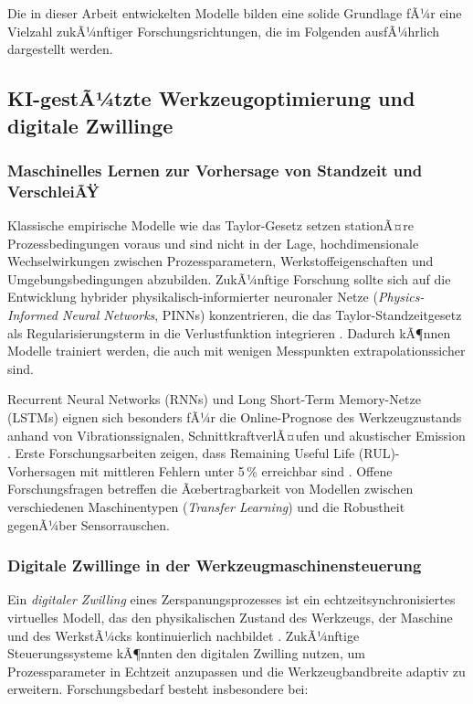 ﻿\documentclass[a4paper,12pt]{article}
\theoremstyle{definition}
\begin{document}
Die in dieser Arbeit entwickelten Modelle bilden eine solide Grundlage fÃ¼r
eine Vielzahl zukÃ¼nftiger Forschungsrichtungen, die im Folgenden ausfÃ¼hrlich
dargestellt werden.

\subsection{KI-gestÃ¼tzte Werkzeugoptimierung und digitale Zwillinge}

\subsubsection{Maschinelles Lernen zur Vorhersage von Standzeit und VerschleiÃŸ}

Klassische empirische Modelle wie das Taylor-Gesetz setzen stationÃ¤re
Prozessbedingungen voraus und sind nicht in der Lage, hochdimensionale
Wechselwirkungen zwischen Prozessparametern, Werkstoffeigenschaften und
Umgebungsbedingungen abzubilden. ZukÃ¼nftige Forschung sollte sich auf die
Entwicklung hybrider physikalisch-informierter neuronaler Netze
(\emph{Physics-Informed Neural Networks}, PINNs) konzentrieren, die das
Taylor-Standzeitgesetz als Regularisierungsterm in die Verlustfunktion
integrieren \cite{raissi2019}. Dadurch kÃ¶nnen Modelle trainiert werden, die
auch mit wenigen Messpunkten extrapolationssicher sind.

Recurrent Neural Networks (RNNs) und Long Short-Term Memory-Netze (LSTMs)
eignen sich besonders fÃ¼r die Online-Prognose des Werkzeugzustands anhand
von Vibrationssignalen, SchnittkraftverlÃ¤ufen und akustischer Emission
\cite{zhao2019}. Erste Forschungsarbeiten zeigen, dass Remaining Useful Life
(RUL)-Vorhersagen mit mittleren Fehlern unter 5\,\% erreichbar sind
\cite{li2019rul}. Offene Forschungsfragen betreffen die Ãœbertragbarkeit
von Modellen zwischen verschiedenen Maschinentypen (\emph{Transfer Learning})
und die Robustheit gegenÃ¼ber Sensorrauschen.

\subsubsection{Digitale Zwillinge in der Werkzeugmaschinensteuerung}

Ein \emph{digitaler Zwilling} eines Zerspanungsprozesses ist ein
echtzeitsynchronisiertes virtuelles Modell, das den physikalischen Zustand
des Werkzeugs, der Maschine und des WerkstÃ¼cks kontinuierlich nachbildet
\cite{tao2018}. ZukÃ¼nftige Steuerungssysteme kÃ¶nnten den digitalen Zwilling
nutzen, um Prozessparameter in Echtzeit anzupassen und die Werkzeugbandbreite
adaptiv zu erweitern. Forschungsbedarf besteht insbesondere bei:
\end{document}

